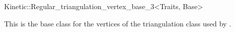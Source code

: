 

\begin{ccRefClass}{Kinetic::Regular_triangulation_vertex_base_3<Traits, Base>}  


\ccDefinition
  
This is the base class for the vertices of the triangulation class
used by .



\end{ccRefClass}


